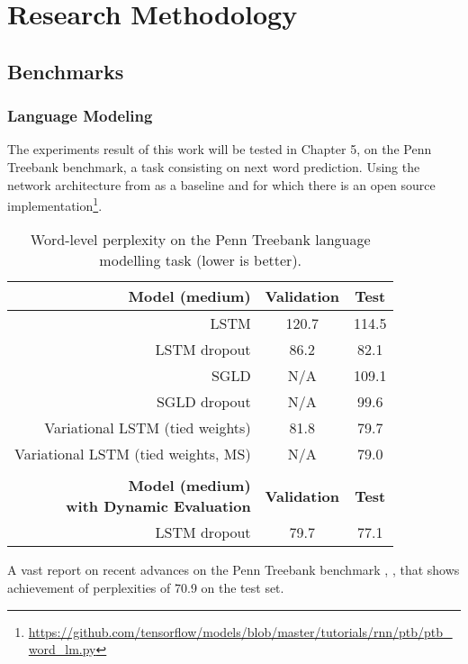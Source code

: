 \chapter{Research Methodology}
\label{chap:method}



\section{Benchmarks}

\subsection{Language Modeling}
The experiments result of this work will be tested in Chapter 5, on the Penn Treebank \cite{Marcus1993} benchmark, a task consisting on next word prediction. Using the network architecture from \cite{Zaremba2014} as a baseline and for which there is an open source implementation\footnote{\url{https://github.com/tensorflow/models/blob/master/tutorials/rnn/ptb/ptb_word_lm.py}}.

\begin{table}[t]
	\caption{Word-level perplexity on the Penn Treebank language modelling task (lower is better).}
	\label{tab:ptb}
	\vskip 0.15in
	\centering
	\small
	\begin{tabular}{r|c|c}
		\textbf{Model (medium)}             & \textbf{Validation} & \textbf{Test} \\ 
		\hline
		\abovespace
		LSTM & 120.7 & 114.5\\
		LSTM dropout                        & 	86.2	        &	82.1 \\
		SGLD    	                        &	N/A				&	109.1		\\
		SGLD dropout	                    &	N/A				&	99.6		\\
		Variational LSTM (tied weights)     &	81.8        	&	79.7 \\
		Variational LSTM (tied weights, MS)	&	N/A		        &	79.0		\\
		\hline 
		& &  \\
		\shortstack{\textbf{Model (medium)} \\ \textbf{with Dynamic Evaluation}}
		& \textbf{Validation} & \textbf{Test} \\
		\hline
		\abovespace
		LSTM dropout                      & 	79.7	        &	77.1 \\
		\hline
	\end{tabular}
	\vskip -0.1in
\end{table}

A vast report on recent advances on the Penn Treebank benchmark \cite{Kim2016}, \cite{Zilly2016}, \cite{Merity2016} that shows achievement of perplexities of 70.9 on the test set.
